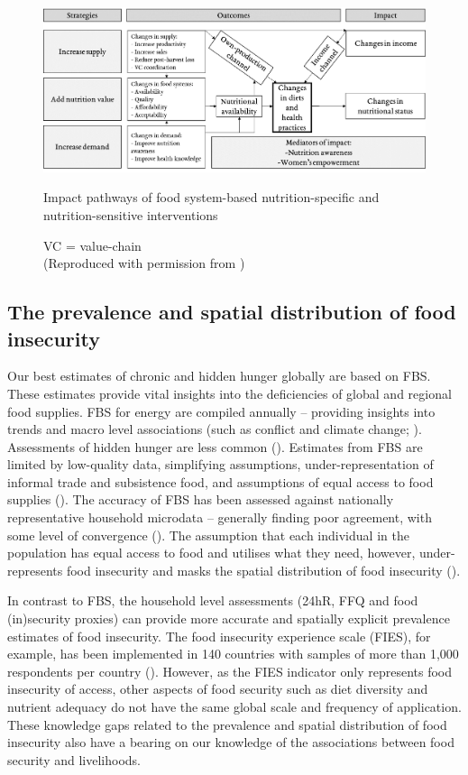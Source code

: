 \begin{figure}
\includegraphics[width=1\textwidth]{figs_07/IFAD_frameworkv2.png}
  \captionsetup{singlelinecheck = off, justification=justified} %
  \caption{Impact pathways of food system-based nutrition-specific and nutrition-sensitive interventions}
  \label{fig:01_1}
  \vspace*{-3mm}
  \caption*{VC = value-chain \\
 	(Reproduced with permission from \citealp{DeLaPena2018})}

\end{figure}

\subsection{The prevalence and spatial distribution of food insecurity}
Our best estimates of chronic and hidden hunger globally are based on FBS. These estimates provide vital insights into the deficiencies of global and regional food supplies. FBS for energy are compiled annually -- providing insights into trends and macro level associations (such as conflict and climate change; \citealp{FAO2018}). Assessments of hidden hunger are less common (\citealp{Kumssa2015, Joy2014}). Estimates from FBS are limited by low-quality data, simplifying assumptions, under-representation of informal trade and subsistence food, and assumptions of equal access to food supplies (\citealp{Micha2018}). The accuracy of FBS has been assessed against nationally representative household microdata -- generally finding poor agreement, with some level of convergence (\citealp{Desiere2018, Gobbo2015, Dowler1985278}). The assumption that each individual in the population has equal access to food and utilises what they need, however, under-represents food insecurity and masks the spatial distribution of food insecurity (\citealp{Micha2018}).

In contrast to FBS, the household level assessments (24hR, FFQ and food (in)security proxies) can provide more accurate and spatially explicit prevalence estimates of food insecurity. The food insecurity experience scale (FIES), for example, has been implemented in 140 countries with samples of more than 1,000 respondents per country (\citealp{FAO2018}). However, as the FIES indicator only represents food insecurity of access, other aspects of food security such as diet diversity and nutrient adequacy do not have the same global scale and frequency of application. These knowledge gaps related to the prevalence and spatial distribution of food insecurity also have a bearing on our knowledge of the associations between food security and livelihoods.

